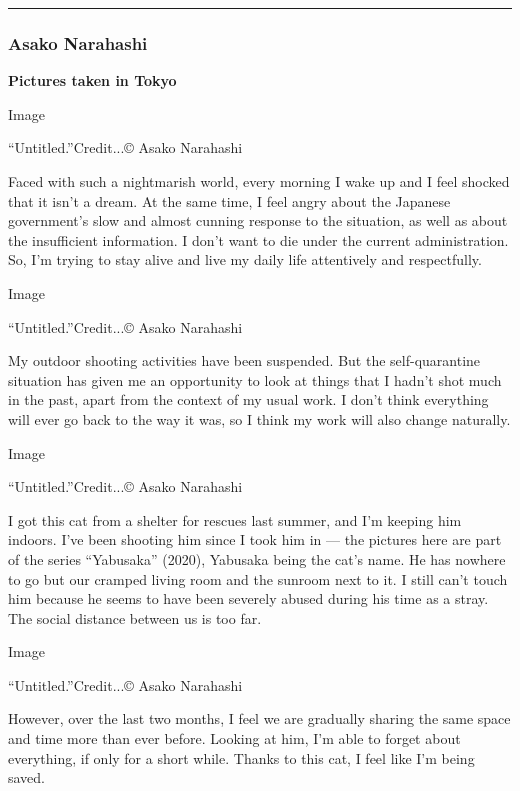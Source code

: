 \begin{center}\rule{0.5\linewidth}{\linethickness}\end{center}

\hypertarget{asako-narahashi}{%
\subsubsection{\texorpdfstring{\textbf{Asako
Narahashi}}{Asako Narahashi}}\label{asako-narahashi}}

\textbf{Pictures taken in Tokyo}

Image

``Untitled.''Credit...© Asako Narahashi

Faced with such a nightmarish world, every morning I wake up and I feel
shocked that it isn't a dream. At the same time, I feel angry about the
Japanese government's slow and almost cunning response to the situation,
as well as about the insufficient information. I don't want to die under
the current administration. So, I'm trying to stay alive and live my
daily life attentively and respectfully.

Image

``Untitled.''Credit...© Asako Narahashi

My outdoor shooting activities have been suspended. But the
self-quarantine situation has given me an opportunity to look at things
that I hadn't shot much in the past, apart from the context of my usual
work. I don't think everything will ever go back to the way it was, so I
think my work will also change naturally.

Image

``Untitled.''Credit...© Asako Narahashi

I got this cat from a shelter for rescues last summer, and I'm keeping
him indoors. I've been shooting him since I took him in --- the pictures
here are part of the series ``Yabusaka'' (2020), Yabusaka being the
cat's name. He has nowhere to go but our cramped living room and the
sunroom next to it. I still can't touch him because he seems to have
been severely abused during his time as a stray. The social distance
between us is too far.

Image

``Untitled.''Credit...© Asako Narahashi

However, over the last two months, I feel we are gradually sharing the
same space and time more than ever before. Looking at him, I'm able to
forget about everything, if only for a short while. Thanks to this cat,
I feel like I'm being saved.


